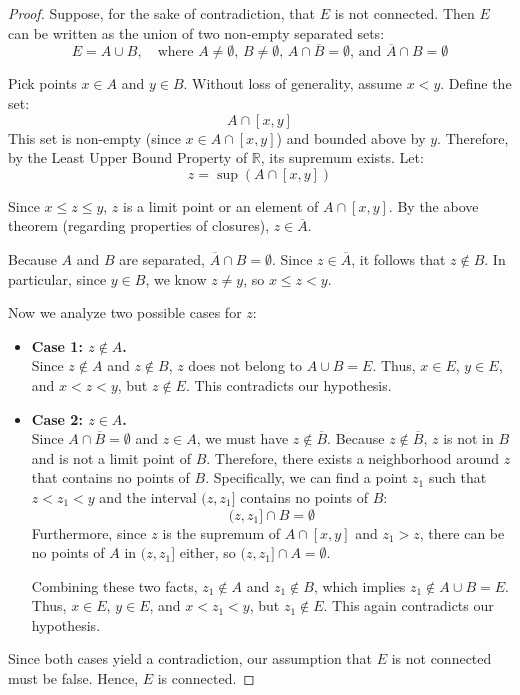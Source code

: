 \documentclass{article}
\theoremstyle{mythm}
\begin{document}
\begin{proof}
Suppose, for the sake of contradiction, that $E$ is not connected. Then $E$ can be written as the union of two non-empty separated sets:
\[ E = A \cup B, \quad \text{where } A \neq \emptyset, \, B \neq \emptyset, \, A \cap \overline{B} = \emptyset, \, \text{and } \overline{A} \cap B = \emptyset \]

Pick points $x \in A$ and $y \in B$. Without loss of generality, assume $x < y$. Define the set:
\[ A \cap [x, y] \]
This set is non-empty (since $x \in A \cap [x, y]$) and bounded above by $y$. Therefore, by the Least Upper Bound Property of $\mathbb{R}$, its supremum exists. Let:
\[ z = \sup(A \cap [x, y]) \]

Since $x \le z \le y$, $z$ is a limit point or an element of $A \cap [x, y]$. By the above theorem (regarding properties of closures), $z \in \overline{A}$.

Because $A$ and $B$ are separated, $\overline{A} \cap B = \emptyset$. Since $z \in \overline{A}$, it follows that $z \notin B$. In particular, since $y \in B$, we know $z \neq y$, so $x \le z < y$.

Now we analyze two possible cases for $z$:

\begin{itemize}
    \item \textbf{Case 1: $z \notin A$.} \\
    Since $z \notin A$ and $z \notin B$, $z$ does not belong to $A \cup B = E$. 
    Thus, $x \in E$, $y \in E$, and $x < z < y$, but $z \notin E$. This contradicts our hypothesis.

    \item \textbf{Case 2: $z \in A$.} \\
    Since $A \cap \overline{B} = \emptyset$ and $z \in A$, we must have $z \notin \overline{B}$. 
    Because $z \notin \overline{B}$, $z$ is not in $B$ and is not a limit point of $B$. Therefore, there exists a neighborhood around $z$ that contains no points of $B$. Specifically, we can find a point $z_1$ such that $z < z_1 < y$ and the interval $(z, z_1]$ contains no points of $B$:
    \[ (z, z_1] \cap B = \emptyset \]
    Furthermore, since $z$ is the supremum of $A \cap [x, y]$ and $z_1 > z$, there can be no points of $A$ in $(z, z_1]$ either, so $(z, z_1] \cap A = \emptyset$.
    
    Combining these two facts, $z_1 \notin A$ and $z_1 \notin B$, which implies $z_1 \notin A \cup B = E$. 
    Thus, $x \in E$, $y \in E$, and $x < z_1 < y$, but $z_1 \notin E$. This again contradicts our hypothesis.
\end{itemize}

Since both cases yield a contradiction, our assumption that $E$ is not connected must be false. Hence, $E$ is connected.
\end{proof}
\end{document}
